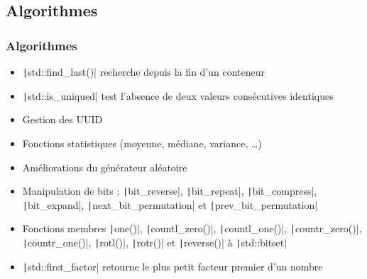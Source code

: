 \documentclass[C++.tex]{subfiles}
\begin{document}
\subsection*{Algorithmes}
\begin{frame}[fragile]
	\frametitle{Algorithmes}
	\begin{itemize}
		\item \texttt|std::find_last()| recherche depuis la fin d'un conteneur
		\item \texttt|std::is_uniqued| test l'absence de deux valeurs consécutives identiques
		\item Gestion des UUID
		\item Fonctions statistiques (moyenne, médiane, variance, \ldots{})
		\item Améliorations du générateur aléatoire
		\item Manipulation de bits : \texttt|bit_reverse|, \texttt|bit_repeat|, \texttt|bit_compress|, \texttt|bit_expand|, \texttt|next_bit_permutation| et \texttt|prev_bit_permutation|
		\item Fonctions membres \texttt|one()|, \texttt|countl_zero()|, \texttt|countl_one()|, \texttt|countr_zero()|, \texttt|countr_one()|, \texttt|rotl()|, \texttt|rotr()| et \texttt|reverse()| à \texttt|std::bitset|
		\item \texttt|std::first_factor| retourne le plus petit facteur premier d'un nombre
	\end{itemize}

\end{frame}
\end{document}
